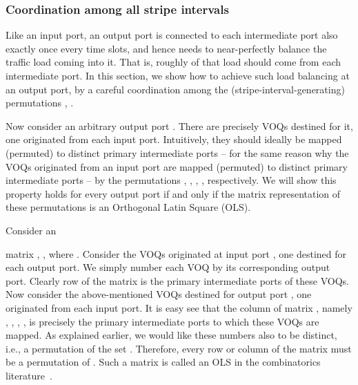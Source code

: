   
















\subsubsection{Coordination among all  stripe intervals}
\label{sec:OLS}



Like an input port, an output port is connected to each intermediate port also exactly once every 
time slots, and hence needs to near-perfectly balance the traffic load coming into it.  That is, roughly  of 
that load should come from each intermediate port.  In this section, we show how to achieve such load balancing at
an output port, by a careful coordination among the (stripe-interval-generating) permutations , .

Now consider an arbitrary output port .  There are precisely  VOQs destined for it, one originated from 
each input port.  Intuitively, they should ideally be mapped (permuted) to  distinct primary intermediate ports 
-- for the same reason why the  VOQs originated from an
input port are mapped (permuted) to  distinct primary intermediate ports --
by the permutations , , , , respectively.  We will show this property 
holds for every output port  if and only if the matrix representation of these permutations is an
Orthogonal Latin Square (OLS).

Consider an 

matrix , ,  
where .
Consider the  VOQs originated at input port , one destined for each output port.  
We simply number 
each VOQ by its corresponding output port.
Clearly row  of the matrix  is the primary intermediate 
ports of these  VOQs.   Now consider the above-mentioned  VOQs destined for output port , one originated from
each input port.   It is easy 
see that the  column of matrix , namely 
, , , , is precisely the primary intermediate ports to which these
 VOQs are mapped.  As explained earlier, we would like these numbers also to be distinct, i.e., a permutation of the set .
Therefore, every row or column of the matrix  must be a permutation of .  Such a matrix is called an 
OLS in the combinatorics literature~\cite{colbourn1996crc}.




